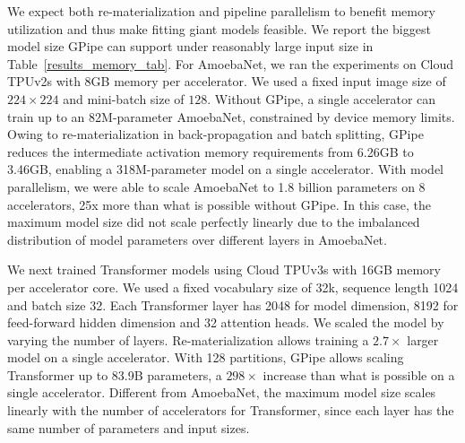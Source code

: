 \documentclass{article}
\def\codename{GPipe}
\begin{document}
We expect both re-materialization and pipeline parallelism to benefit memory utilization and thus make fitting giant models feasible. We report the biggest model size \codename{} can support under reasonably large input size in Table~\ref{results_memory_tab}. For AmoebaNet, we ran the experiments on Cloud TPUv2s with 8GB memory per accelerator. We used a fixed input image size of $224\times224$ and mini-batch size of $128$.  Without \codename{}, a single accelerator can train up to an 82M-parameter AmoebaNet, constrained by device memory limits. Owing to re-materialization in back-propagation and batch splitting, \codename{} reduces the intermediate activation memory requirements from 6.26GB to 3.46GB, 
enabling a 318M-parameter model on a single accelerator.  With model parallelism, we were able to scale AmoebaNet to 1.8 billion parameters on 8 accelerators, 25x more than what is possible without \codename{}. In this case, the maximum model size did not scale perfectly linearly due to the imbalanced distribution of model parameters over different layers in AmoebaNet.

We next trained Transformer models using Cloud TPUv3s with 16GB memory per accelerator core. We used a fixed vocabulary size of 32k, sequence length 1024 and batch size 32. Each Transformer layer has 2048 for model dimension, 8192 for feed-forward hidden dimension and 32 attention heads. We scaled the model by varying the number of layers. Re-materialization allows training a $2.7\times$ larger model on a single accelerator. With 128 partitions, \codename{} allows scaling Transformer up to 83.9B parameters, a $298\times$ increase than what is possible on a single accelerator. Different from AmoebaNet, the maximum model size scales linearly with the number of accelerators for Transformer, since each layer has the same number of parameters and input sizes. 
\end{document}
